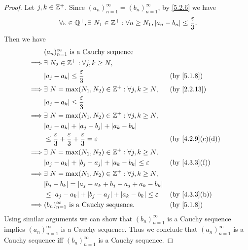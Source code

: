\begin{proof}
  Let \(j, k \in \mathbb{Z}^+\).
  Since \((a_n)_{n = 1}^\infty = (b_n)_{n = 1}^\infty\), by \cref{5.2.6} we have
  \[
    \forall \varepsilon \in \mathbb{Q}^+, \exists\ N_1 \in \mathbb{Z}^+ : \forall n \geq N_1, \left\lvert a_n - b_n\right\rvert \leq \dfrac{\varepsilon}{3}.
  \]
  Then we have
  \begin{align*}
             & (a_n)_{n = 1}^\infty \text{ is a Cauchy sequence}                                                                               \\
    \implies & \exists\ N_2 \in \Z^+ : \forall j, k \geq N,                                                                                    \\
             & \abs{a_j - a_k} \leq \dfrac{\varepsilon}{3}                                                 &  & \text{(by \cref{5.1.8})}       \\
    \implies & \exists\ N = \max(N_1, N_2) \in \Z^+ : \forall j, k \geq N,                                 &  & \text{(by \cref{2.2.13})}      \\
             & \abs{a_j - a_k} \leq \dfrac{\varepsilon}{3}                                                                                     \\
    \implies & \exists\ N = \max(N_1, N_2) \in \Z^+ : \forall j, k \geq N,                                                                     \\
             & \abs{a_j - a_k} + \abs{a_j - b_j} + \abs{a_k - b_k}                                                                             \\
             & \leq \dfrac{\varepsilon}{3} + \dfrac{\varepsilon}{3} + \dfrac{\varepsilon}{3} = \varepsilon &  & \text{(by \cref{4.2.9}(c)(d))} \\
    \implies & \exists\ N = \max(N_1, N_2) \in \Z^+ : \forall j, k \geq N,                                                                     \\
             & \abs{a_j - a_k} + \abs{b_j - a_j} + \abs{a_k - b_k} \leq \varepsilon                        &  & \text{(by \cref{4.3.3}(f))}    \\
    \implies & \exists\ N = \max(N_1, N_2) \in \Z^+ : \forall j, k \geq N,                                                                     \\
             & \abs{b_j - b_k} = \abs{a_j - a_k + b_j - a_j + a_k - b_k}                                                                       \\
             & \leq \abs{a_j - a_k} + \abs{b_j - a_j} + \abs{a_k - b_k} \leq \varepsilon                   &  & \text{(by \cref{4.3.3}(b))}    \\
    \implies & (b_n)_{n = 1}^\infty \text{ is a Cauchy sequence}.                                          &  & \text{(by \cref{5.1.8})}
  \end{align*}
  Using similar arguments we can show that \((b_n)_{n = 1}^\infty\) is a Cauchy sequence implies \((a_n)_{n = 1}^\infty\) is a Cauchy sequence.
  Thus we conclude that \((a_n)_{n = 1}^\infty\) is a Cauchy sequence iff \((b_n)_{n = 1}^\infty\) is a Cauchy sequence.
\end{proof}

